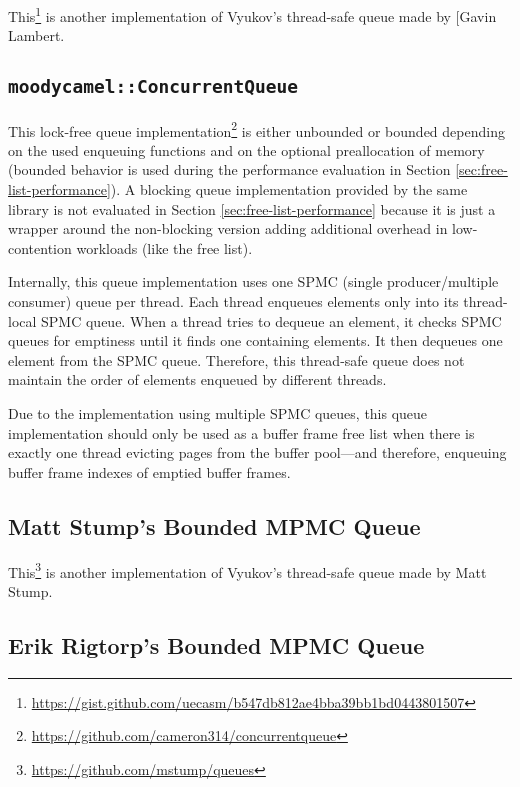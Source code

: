 	This\footnote{\url{https://gist.github.com/uecasm/b547db812ae4bba39bb1bd0443801507}} is another implementation of Vyukov's thread-safe queue made by [Gavin Lambert.

\subsection[\lstinline{moodycamel::ConcurrentQueue}]{\lstinline{moodycamel::ConcurrentQueue}} \label{subsec:moodycamel}

	This lock-free queue implementation\footnote{\url{https://github.com/cameron314/concurrentqueue}} is either unbounded or bounded depending on the used enqueuing functions and on the optional preallocation of memory (bounded behavior is used during the performance evaluation in Section \ref{sec:free-list-performance}). A blocking queue implementation provided by the same library is not evaluated in Section \ref{sec:free-list-performance} because it is just a wrapper around the non-blocking version adding additional overhead in low-contention workloads (like the free list).
	
	Internally, this queue implementation uses one SPMC (single producer/multiple consumer) queue per thread. Each thread enqueues elements only into its thread-local SPMC queue. When a thread tries to dequeue an element, it checks SPMC queues for emptiness until it finds one containing elements. It then dequeues one element from the SPMC queue. Therefore, this thread-safe queue does not maintain the order of elements enqueued by different threads.
	
	Due to the implementation using multiple SPMC queues, this queue implementation should only be used as a buffer frame free list when there is exactly one thread evicting pages from the buffer pool---and therefore, enqueuing buffer frame indexes of emptied buffer frames.

\subsection[Matt Stump's MPMC Queue]{Matt Stump's Bounded MPMC Queue} \label{subsec:vyukov-variation}

	This\footnote{\url{https://github.com/mstump/queues}} is another implementation of Vyukov's thread-safe queue made by Matt Stump.

\subsection[Erik Rigtorp's MPMC Queue]{Erik Rigtorp's Bounded MPMC Queue} \label{subsec:rigtorp}


